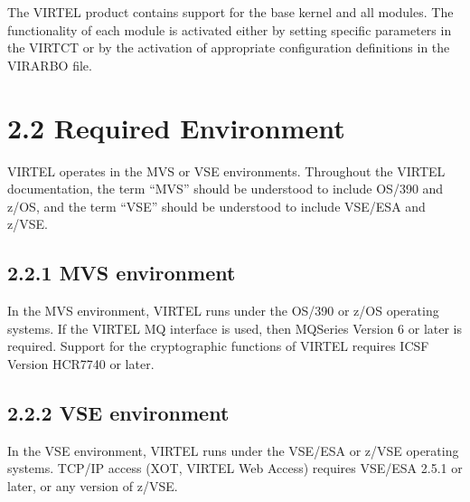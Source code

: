 \documentclass[letterpaper,10pt,english]{sphinxmanual}
\begin{document}
The VIRTEL product contains support for the base kernel and all modules. The functionality of each module is activated either by setting specific parameters in the VIRTCT or by the activation of appropriate configuration definitions in the VIRARBO file.

\begin{DUlineblock}{0em}
\item[] 
\end{DUlineblock}


\section{2.2 Required Environment}
\label{\detokenize{Installation_Guide:required-environment}}
VIRTEL operates in the MVS or VSE environments. Throughout the VIRTEL documentation, the term “MVS” should be understood to include OS/390 and z/OS, and the term “VSE” should be understood to include VSE/ESA and z/VSE.


\subsection{2.2.1 MVS environment}
\label{\detokenize{Installation_Guide:mvs-environment}}
In the MVS environment, VIRTEL runs under the OS/390 or z/OS operating systems. If the VIRTEL MQ interface is used, then MQSeries Version 6 or later is required. Support for the cryptographic functions of VIRTEL requires ICSF Version HCR7740 or later.


\subsection{2.2.2 VSE environment}
\label{\detokenize{Installation_Guide:vse-environment}}
In the VSE environment, VIRTEL runs under the VSE/ESA or z/VSE operating systems. TCP/IP access (XOT, VIRTEL Web Access) requires VSE/ESA 2.5.1 or later, or any version of z/VSE.
\end{document}
